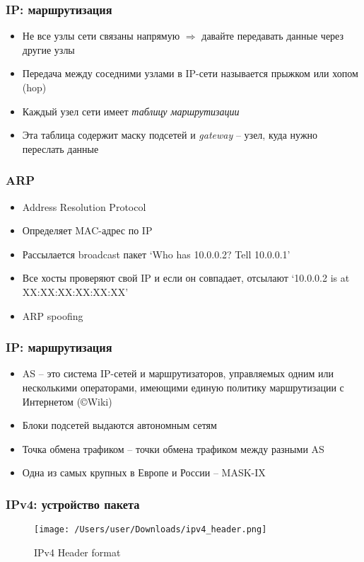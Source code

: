   \subsubsection{IP: маршрутизация}
    \begin{itemize}
      \item Не все узлы сети связаны напрямую $\Rightarrow$ давайте передавать данные через другие узлы
      \item Передача между соседними узлами в IP-сети называется прыжком или хопом (hop)
      \item Каждый узел сети имеет \textit{таблицу маршрутизации}
      \item Эта таблица содержит маску подсетей и \textit{gateway} -- узел, куда нужно переслать данные
    \end{itemize}
  
  \subsubsection{ARP}
    \begin{itemize}
      \item Address Resolution Protocol
      \item Определяет MAC-адрес по IP
      \item Рассылается broadcast пакет `Who has 10.0.0.2? Tell 10.0.0.1'
      \item Все хосты проверяют свой IP и если он совпадает, отсылают `10.0.0.2 is at XX:XX:XX:XX:XX:XX'
      \item ARP spoofing
    \end{itemize}
  
  \subsubsection{IP: маршрутизация}
    \begin{itemize}
      \item AS -- это система IP-сетей и маршрутизаторов, управляемых одним или несколькими операторами, имеющими единую политику маршрутизации с Интернетом (\copyright Wiki)
      \item Блоки подсетей выдаются автономным сетям
      \item Точка обмена трафиком -- точки обмена трафиком между разными AS
      \item Одна из самых крупных в Европе и России -- MASK-IX
    \end{itemize}
  
  \subsubsection{IPv4: устройство пакета}
\begin{figure}[H]
  \centering
  \texttt{[image: /Users/user/Downloads/ipv4\_header.png]}
  \caption{IPv4 Header format}
  \label{fig:ipv4_format}
\end{figure}
  
